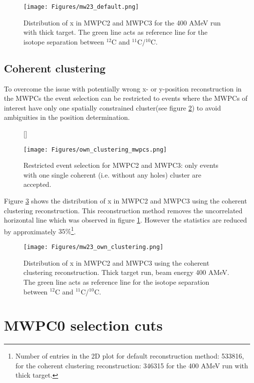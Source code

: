 \begin{appendices}
\begin{figure}[htpb]
    \centering
    \texttt{[image: Figures/mw23\_default.png]}
    \caption{
   	 Distribution of x in MWPC2 and MWPC3 for the 400 AMeV run with thick target. The green line acts as reference line for the isotope separation between $^{12}$C and $^{11}$C/$^{10}$C.
     }
    \label{fig:x_mw23_default}
\end{figure}


\subsection {Coherent clustering} 

To overcome the issue with potentially wrong x- or y-position reconstruction in the MWPCs the event selection can be restricted to events where the MWPCs of interest have only one spatially constrained cluster(see figure \ref{fig:own_clustering}) to avoid ambiguities in the position determination.\newline
\begin{figure}
[\FBwidth]
{\caption{Restricted event selection for MWPC2 and MWPC3: only events with one single coherent (i.e. without any holes) cluster are accepted.}\label{fig:own_clustering}}
{\texttt{[image: Figures/own\_clustering\_mwpcs.png]}}
\end{figure}
Figure \ref{fig:mw23_own_clustering} shows the distribution of x in MWPC2 and MWPC3 using the coherent clustering reconstruction. This reconstruction method removes the uncorrelated horizontal line which was observed in figure \ref{fig:x_mw23_default}. However the statistics are reduced by approximately $35\%$\footnote{Number of entries in the 2D plot for default reconstruction method: 533816, for the coherent clustering reconstruction: 346315 for the 400 AMeV run with thick target.}.
\begin{figure}[htpb]
    \centering
    \texttt{[image: Figures/mw23\_own\_clustering.png]}
    \caption{
   	 Distribution of x in MWPC2 and MWPC3 using the coherent clustering reconstruction. Thick target run, beam energy 400 AMeV. The green line acts as reference line for the isotope separation between $^{12}$C and $^{11}$C/$^{10}$C.
     }
    \label{fig:mw23_own_clustering}
\end{figure}

\section {MWPC0 selection cuts}\label{app:mw0_cuts}


\end{appendices}
